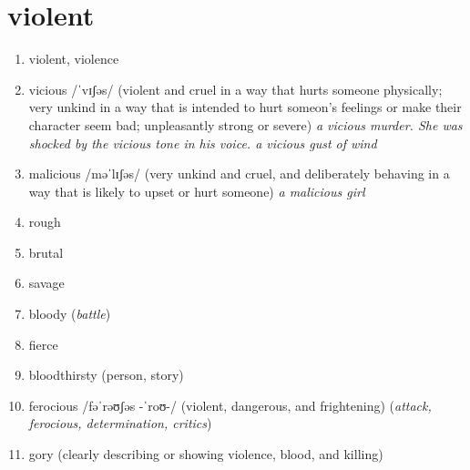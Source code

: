\section{violent}
\begin{enumerate}
    \item violent, violence
    \item vicious /ˈvɪʃəs/ (violent and cruel in a way that hurts someone physically; very unkind in a way that is intended to hurt someon's feelings or make their character seem bad; unpleasantly strong or severe) \textit{a vicious murder. She was shocked by the vicious tone in his voice. a vicious gust of wind}
    \item malicious /məˈlɪʃəs/ (very unkind and cruel, and deliberately behaving in a way that is likely to upset or hurt someone) \textit{a malicious girl}
    \item rough
    \item brutal
    \item savage
    \item bloody (\textit{battle})
    \item fierce
    \item bloodthirsty (person, story)
    \item ferocious /fəˈrəʊʃəs  -ˈroʊ-/   (violent, dangerous, and frightening) (\textit{attack, ferocious, determination, critics})
    \item gory (clearly describing or showing violence, blood, and killing)
\end{enumerate}

